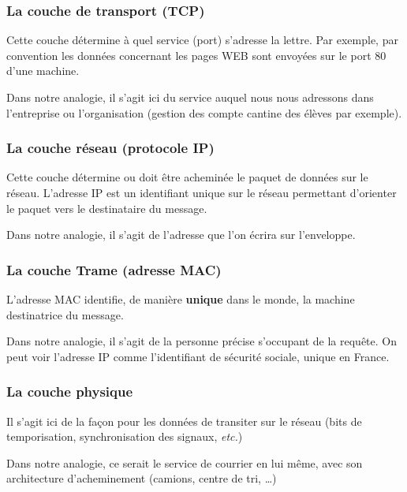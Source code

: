 \documentclass[10pt,fleqn]{article} %
\begin{document}
\subsubsection{La couche de transport (TCP)}
Cette couche détermine à quel service (port) s'adresse la lettre. Par exemple, par convention les données concernant les pages WEB sont envoyées sur le port 80 d'une machine.

\begin{remark}
  Dans notre analogie, il s'agit ici du service auquel nous nous adressons dans l'entreprise ou l'organisation (gestion des compte cantine des élèves par exemple).
\end{remark}

\subsubsection{La couche réseau (protocole IP)}
Cette couche détermine ou doit être acheminée le paquet de données sur le réseau. L'adresse IP est un identifiant unique sur le réseau permettant d'orienter le paquet vers le destinataire du message.

\begin{remark}
  Dans notre analogie, il s'agit de l'adresse que l'on écrira sur l'enveloppe.
\end{remark}

\subsubsection{La couche Trame (adresse MAC)}
L'adresse MAC identifie, de manière \textbf{unique} dans le monde, la machine destinatrice du message.

\begin{remark}
  Dans notre analogie, il s'agit de la personne précise s'occupant de la requête. On peut voir l'adresse IP comme l'identifiant de sécurité sociale, unique en France.
\end{remark}

\subsubsection{La couche physique}
Il s'agit ici de la façon pour les données de transiter sur le réseau (bits de temporisation, synchronisation des signaux, \textit{etc.})

\begin{remark}
  Dans notre analogie, ce serait le service de courrier en lui même, avec son architecture d'acheminement (camions, centre de tri, \dots)
\end{remark}
\end{document}
